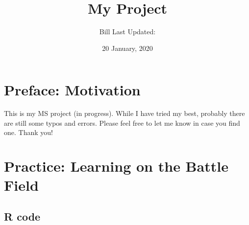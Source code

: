 \documentclass[]{book}
\title{My Project}
\author{Bill Last Updated:}
\date{20 January, 2020}
\begin{document}
\maketitle

{
\setcounter{tocdepth}{1}
\tableofcontents
}
\chapter*{Preface: Motivation}\label{my-section}

This is my MS project (in progress). While I have tried my best,
probably there are still some typos and errors. Please feel free to let
me know in case you find one. Thank you!

\chapter{Practice: Learning on the Battle
Field}\label{practice-learning-on-the-battle-field}

\section{R code}\label{r-code}
\end{document}
